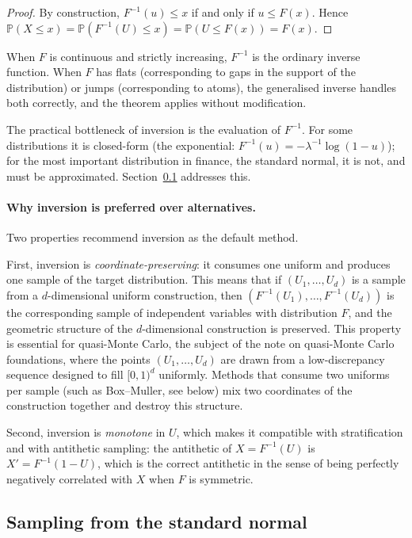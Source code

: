 \documentclass[11pt,a4paper]{article}
\theoremstyle{plain}
\theoremstyle{definition}
\theoremstyle{remark}
\newcommand{\Prob}{\mathbb{P}}
\begin{document}
\begin{proof}
By construction, $F^{-1}(u) \leq x$ if and only if $u \leq F(x)$.
Hence $\Prob(X \leq x) = \Prob(F^{-1}(U) \leq x) = \Prob(U \leq F(x))
= F(x)$.
\end{proof}

When $F$ is continuous and strictly increasing, $F^{-1}$ is the
ordinary inverse function. When $F$ has flats (corresponding to gaps in
the support of the distribution) or jumps (corresponding to atoms), the
generalised inverse handles both correctly, and the theorem applies
without modification.

The practical bottleneck of inversion is the evaluation of $F^{-1}$.
For some distributions it is closed-form (the exponential:
$F^{-1}(u) = -\lambda^{-1}\log(1-u)$); for the most important
distribution in finance, the standard normal, it is not, and must be
approximated. Section~\ref{sec:normal-sampling} addresses this.

\paragraph{Why inversion is preferred over alternatives.} Two
properties recommend inversion as the default method.

First, inversion is \emph{coordinate-preserving}: it consumes one
uniform and produces one sample of the target distribution. This means
that if $(U_1, \dots, U_d)$ is a sample from a $d$-dimensional uniform
construction, then $(F^{-1}(U_1), \dots, F^{-1}(U_d))$ is the
corresponding sample of independent variables with distribution $F$,
and the geometric structure of the $d$-dimensional construction is
preserved. This property is essential for quasi-Monte Carlo, the
subject of the note on quasi-Monte Carlo foundations, where the points
$(U_1, \dots, U_d)$ are drawn from
a low-discrepancy sequence designed to fill $[0,1)^d$ uniformly. Methods
that consume two uniforms per sample (such as Box--Muller, see below)
mix two coordinates of the construction together and destroy this
structure.

Second, inversion is \emph{monotone} in $U$, which makes it compatible
with stratification and with antithetic sampling: the
antithetic of $X = F^{-1}(U)$ is $X' = F^{-1}(1-U)$, which is the
correct antithetic in the sense of being perfectly negatively correlated
with $X$ when $F$ is symmetric.

\subsection{Sampling from the standard normal}
\label{sec:normal-sampling}
\end{document}
